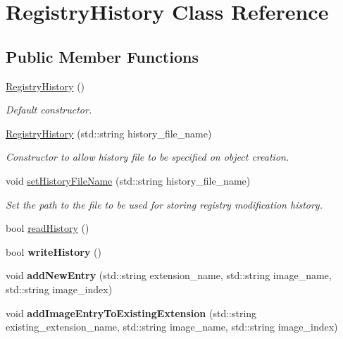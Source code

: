 \hypertarget{class_registry_history}{}\section{Registry\+History Class Reference}
\label{class_registry_history}
\subsection*{Public Member Functions}
\begin{DoxyCompactItemize}
\item 
\hypertarget{class_registry_history_ab8ca406519bf9c2383af62b655e091ec}{}\hyperlink{class_registry_history_ab8ca406519bf9c2383af62b655e091ec}{Registry\+History} ()\label{class_registry_history_ab8ca406519bf9c2383af62b655e091ec}

\begin{DoxyCompactList}\small\item\em Default constructor. \end{DoxyCompactList}\item 
\hyperlink{class_registry_history_a273475e8adc13cafd38889ef52158b9e}{Registry\+History} (std\+::string history\+\_\+file\+\_\+name)
\begin{DoxyCompactList}\small\item\em Constructor to allow history file to be specified on object creation. \end{DoxyCompactList}\item 
void \hyperlink{class_registry_history_afb10619d4c6e5b1eef4f27b11aa71ec8}{set\+History\+File\+Name} (std\+::string history\+\_\+file\+\_\+name)
\begin{DoxyCompactList}\small\item\em Set the path to the file to be used for storing registry modification history. \end{DoxyCompactList}\item 
bool \hyperlink{class_registry_history_a2a81ef9ef2d13fba16c4596a5e24409b}{read\+History} ()
\item 
\hypertarget{class_registry_history_ad05f552791c50a88291483544f9ffb80}{}bool {\bfseries write\+History} ()\label{class_registry_history_ad05f552791c50a88291483544f9ffb80}

\item 
\hypertarget{class_registry_history_a698bd300223a56f854eaba6ad3dc46e3}{}void {\bfseries add\+New\+Entry} (std\+::string extension\+\_\+name, std\+::string image\+\_\+name, std\+::string image\+\_\+index)\label{class_registry_history_a698bd300223a56f854eaba6ad3dc46e3}

\item 
\hypertarget{class_registry_history_a317fd9397fe324c06087a67c403aa7b9}{}void {\bfseries add\+Image\+Entry\+To\+Existing\+Extension} (std\+::string existing\+\_\+extension\+\_\+name, std\+::string image\+\_\+name, std\+::string image\+\_\+index)\label{class_registry_history_a317fd9397fe324c06087a67c403aa7b9}

\end{DoxyCompactItemize}


